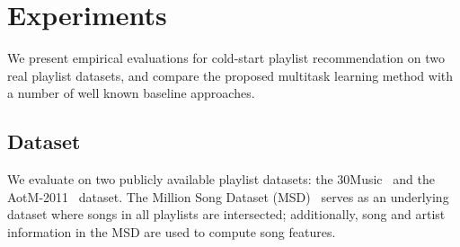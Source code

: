 \section{Experiments}
\label{sec:experiment}

We present empirical evaluations for cold-start playlist recommendation on two real playlist datasets,
and compare the proposed multitask learning method with a number of well known baseline approaches.


\subsection{Dataset}
We evaluate on 
two publicly available playlist datasets: the 30Music~\cite{30music2015} and 
the AotM-2011~\cite{mcfee2012hypergraph} dataset.
The Million Song Dataset (MSD)~\cite{msd2011} serves as an underlying dataset where songs in all playlists 
are intersected; additionally, song and artist information in the MSD are used to compute song features.

 


\begin{table}[hbt]
\centering
\caption{Music playlist dataset}
\label{tab:stats_pldata}
\end{table}

